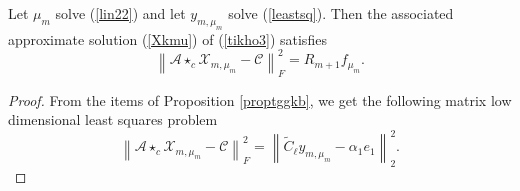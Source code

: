 \documentclass{siamltex}
\newcommand{\1}{\mathbb{1}}
\newcommand{\0}{\mathbb{0}}
\begin{document}
	
	\begin{proposition}
		Let $\mu_{m}$ solve (\ref{lin22}) and let $y_{m,\mu_m}$ solve (\ref{leastsq}). Then the associated approximate solution (\ref{Xkmu}) of (\ref{tikho3}) satisfies
		$$
		\left\|\mathscr{A}\star_c \mathscr{X}_{m,\mu_m}-\mathscr{C}\right\|_{F}^{2}=R_{m+1} f_{\mu_{m}}.
		$$
		
	\end{proposition}
	\begin{proof} From the  items  of Proposition \ref{proptggkb}, we get the following matrix low dimensional least  squares problem 
		$$
		\left\|\mathscr{A}\star_c \mathscr{X}_{m,\mu_m}-\mathscr{C}\right\|_{F}^{2}=\left\|\widetilde{C}_\ell y_{m,\mu_m}-\alpha_1e_1\right\|_{2}^{2}.$$		

\end{proof}
\end{document}
